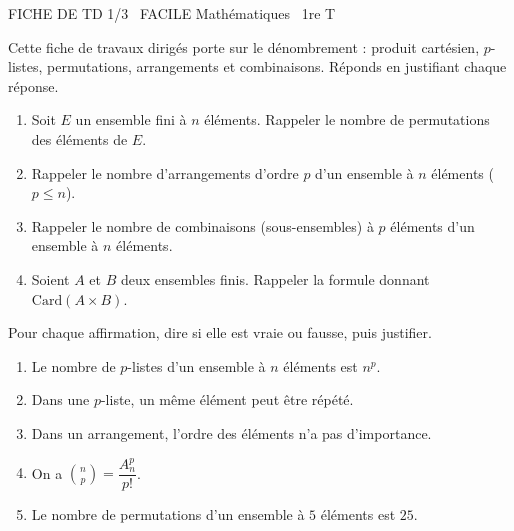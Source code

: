 \documentclass[11pt]{article}
\begin{document}
\begin{tcolorbox}[enhanced,colback=popink,colframe=popink,arc=10pt,boxrule=0pt,left=12pt,right=12pt,top=9pt,bottom=9pt]
{\color{white}\popxbold\small FICHE DE TD 1/3 \textbullet\ FACILE \hfill Mathématiques \textbullet\ 1re T\par}
\end{tcolorbox}
\vspace{4pt}
Cette fiche de travaux dirigés porte sur le dénombrement : produit cartésien, $p$-listes, permutations, arrangements et combinaisons. Réponds en justifiant chaque réponse.

\begin{exercice}
\begin{enumerate}
  \item Soit $E$ un ensemble fini à $n$ éléments. Rappeler le nombre de permutations des éléments de $E$.
  \item Rappeler le nombre d'arrangements d'ordre $p$ d'un ensemble à $n$ éléments ($p \leq n$).
  \item Rappeler le nombre de combinaisons (sous-ensembles) à $p$ éléments d'un ensemble à $n$ éléments.
  \item Soient $A$ et $B$ deux ensembles finis. Rappeler la formule donnant $\mathrm{Card}(A \times B)$.
\end{enumerate}
\end{exercice}

\begin{exercice}
Pour chaque affirmation, dire si elle est vraie ou fausse, puis justifier.
\begin{enumerate}
  \item Le nombre de $p$-listes d'un ensemble à $n$ éléments est $n^p$.
  \item Dans une $p$-liste, un même élément peut être répété.
  \item Dans un arrangement, l'ordre des éléments n'a pas d'importance.
  \item On a $\binom{n}{p} = \dfrac{A_n^p}{p!}$.
  \item Le nombre de permutations d'un ensemble à $5$ éléments est $25$.
\end{enumerate}
\end{exercice}
\end{document}
